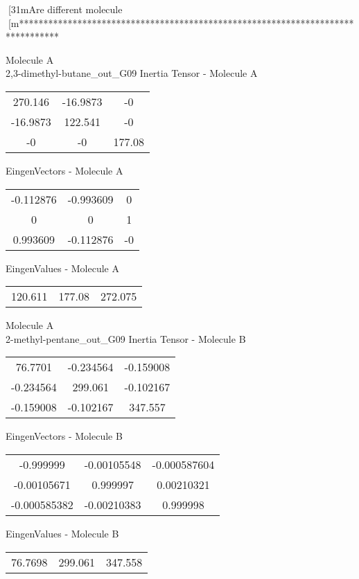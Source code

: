 [31mAre different molecule
[m********************************************************************************
\newpage
\begin{multicols}{2}
\begin{center}
Molecule A \\ 
2,3-dimethyl-butane_out_G09
Inertia Tensor - Molecule A \\
\vtab
\begin{tabular}{|c c c|}
270.146	 & 	-16.9873	 & 	-0	 \\
-16.9873	 & 	122.541	 & 	-0	 \\
-0	 & 	-0	 & 	177.08
\end{tabular}

\vtab
 EingenVectors - Molecule A     \\
\vtab
\begin{tabular}{|c c c|}
-0.112876	 & 	-0.993609	 & 	0	 \\
0	 & 	0	 & 	1	 \\
0.993609	 & 	-0.112876	 & 	-0
\end{tabular}

\vtab
 EingenValues - Molecule A     \\
\vtab
\begin{tabular}{|c c c|}
120.611	 & 	177.08	 & 	272.075
\end{tabular}
\columnbreak
Molecule A \\ 
2-methyl-pentane_out_G09
Inertia Tensor - Molecule B \\
\vtab
\begin{tabular}{|c c c|}
76.7701	 & 	-0.234564	 & 	-0.159008	 \\
-0.234564	 & 	299.061	 & 	-0.102167	 \\
-0.159008	 & 	-0.102167	 & 	347.557
\end{tabular}

\vtab
 EingenVectors - Molecule B     \\
\vtab
\begin{tabular}{|c c c|}
-0.999999	 & 	-0.00105548	 & 	-0.000587604	 \\
-0.00105671	 & 	0.999997	 & 	0.00210321	 \\
-0.000585382	 & 	-0.00210383	 & 	0.999998
\end{tabular}

\vtab
 EingenValues - Molecule B     \\
\vtab
\begin{tabular}{|c c c|}
76.7698	 & 	299.061	 & 	347.558
\end{tabular}
\end{center}
\end{multicols}
